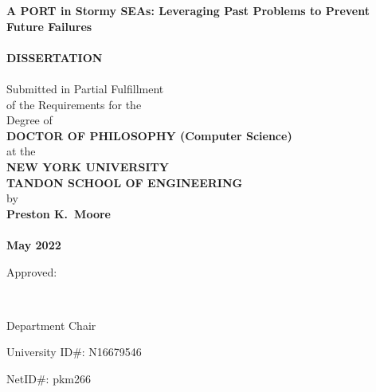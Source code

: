 \thispagestyle{empty}
\begin{center}
{\large
{\bf A PORT in Stormy SEAs: Leveraging Past Problems to Prevent Future Failures}\\
\mbox{} \\
{\huge \bf DISSERTATION}\\
\mbox{} \\
Submitted in Partial Fulfillment\\
of the Requirements for the\\
Degree of\\
{\bf DOCTOR OF PHILOSOPHY (Computer Science)}\\
at the\\
{\bf NEW YORK UNIVERSITY\\TANDON SCHOOL OF ENGINEERING}\\
by\\
{\bf Preston K.\ Moore}\\
\mbox{} \\
{\bf  May 2022}}
\end{center}
\vspace{.35 in}
\hspace{4 in} Approved:

\vspace{.2 in}

\hspace{3.35 in} \hrulefill\

\vspace{-.2 in}

\hspace{3.6 in} Department Chair

\vspace{.2 in}

\hspace{-.5 in}University ID\#: N16679546 \hspace{4 in}

\hspace{-.5 in}NetID\#: pkm266 \hspace{4 in}

\vspace{-.4 in}

\hspace{3.35 in} \hrulefill\ %



